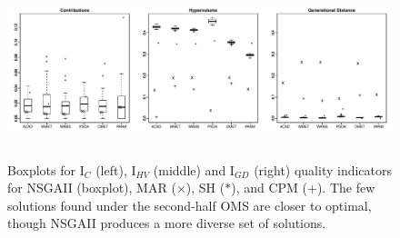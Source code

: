 \documentclass[conference]{IEEEtran}
\begin{document}
\begin{figure}
\centering
\includegraphics[width=18cm, height=5cm]{boxplots.pdf}
\caption{Boxplots for I$_{C}$ (left), I$_{HV}$ (middle) and I$_{GD}$ (right) quality indicators for NSGAII (boxplot), MAR ($\times$), SH ($\ast$), and CPM (+). The few solutions found under the second-half OMS are closer to optimal, though NSGAII produces a more diverse set of solutions.}
\end{figure}
\end{document}
